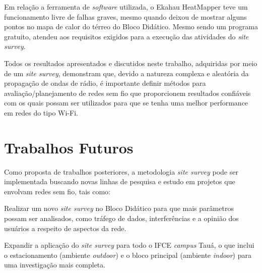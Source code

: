 Em relação a ferramenta de \textit{software} utilizada, o Ekahau HeatMapper teve um funcionamento livre de falhas graves, mesmo quando deixou de mostrar alguns pontos no mapa de calor do térreo do Bloco Didático. Mesmo sendo um programa gratuito, atendeu aos requisitos exigidos para a execução das atividades do \textit{site survey}.

Todos os resultados apresentados e discutidos neste trabalho, adquiridas por meio de um \textit{site survey}, demonstram que, devido a natureza complexa e aleatória da propagação de ondas de rádio, é importante definir métodos para avaliação/planejamento de redes sem fio que proporcionem resultados confiáveis com os quais possam ser utilizados para que se tenha uma melhor performance em redes do tipo Wi-Fi.

\section{Trabalhos Futuros}
\label{sec:trabalhos-futuros}

Como proposta de trabalhos posteriores, a metodologia \textit{site survey} pode ser implementada buscando novas linhas de pesquisa e estudo em projetos que envolvam redes sem fio, tais como:

\begin{compactitem}
	\item Realizar um novo \textit{site survey} no Bloco Didático para que mais parâmetros possam ser analisados, como tráfego de dados, interferências e a opinião dos usuários a respeito de aspectos da rede.
	
	
	\item Expandir a aplicação do \textit{site survey} para todo o IFCE \textit{campus} Tauá, o que inclui o estacionamento (ambiente \textit{outdoor}) e o bloco principal (ambiente \textit{indoor}) para uma investigação mais completa.
\end{compactitem}


